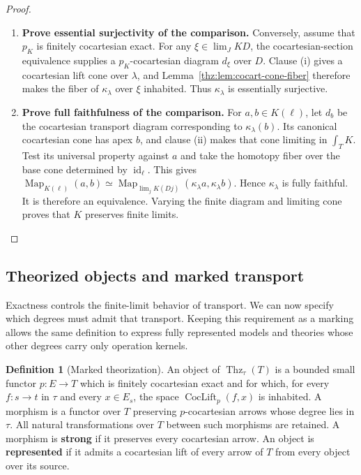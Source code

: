 \documentclass[oneside]{article}
\theoremstyle{plain}
\theoremstyle{definition}
\newtheorem{definition}[theorem]{Definition}
\theoremstyle{remark}
\newcommand{\Map}{\operatorname{Map}}
\newcommand{\Thz}{\operatorname{Thz}}
\newcommand{\id}{\operatorname{id}}
\begin{document}
\begin{proof}
\begin{enumerate}
\begin{samepage}
\end{samepage}
\item \textbf{Prove essential surjectivity of the comparison.} Conversely, assume that $p_K$ is finitely cocartesian exact.  For any
$\xi\in\lim_JKD$, the cocartesian-section equivalence supplies a
$p_K$-cocartesian diagram $d_\xi$ over $D$.  Clause (i) gives a
cocartesian lift cone over $\lambda$, and
Lemma~\ref{thz:lem:cocart-cone-fiber} therefore makes the fiber of
$\kappa_\lambda$ over $\xi$ inhabited.  Thus $\kappa_\lambda$ is
essentially surjective.
\item \textbf{Prove full faithfulness of the comparison.} For $a,b\in K(\ell)$, let $d_b$ be the cocartesian transport diagram
corresponding to $\kappa_\lambda(b)$.  Its canonical cocartesian cone has
apex $b$, and clause (ii) makes that cone limiting in $\int_TK$.  Test its
universal property against $a$ and take the homotopy fiber over the base cone
determined by $\id_\ell$.  This gives $\Map_{K(\ell)}(a,b)\simeq \Map_{\lim_jK(Dj)} (\kappa_\lambda a,\kappa_\lambda b).$ Hence $\kappa_\lambda$ is fully faithful.  It is therefore an equivalence.
Varying the finite diagram and limiting cone proves that $K$ preserves
finite limits.\qedhere
\end{enumerate}
\end{proof}

\subsection{Theorized objects and marked transport}

Exactness controls the finite-limit behavior of transport. We can now
specify which degrees must admit that transport. Keeping this requirement
as a marking allows the same definition to express fully represented
models and theories whose other degrees carry only operation kernels.

\begin{definition}[Marked theorization]\label{thz:def:thz}
An object of $\Thz_\tau(T)$ is a bounded small functor $p:E\to T$
which is finitely cocartesian exact and for which, for every
$f:s\to t$ in $\tau$ and every $x\in E_s$, the space
$\operatorname{CocLift}_p(f,x)$ is inhabited.  A morphism is a functor
over $T$ preserving $p$-cocartesian arrows whose degree lies in $\tau$.
All natural transformations over $T$ between such morphisms are retained.
A morphism is \textbf{strong} if it preserves every cocartesian arrow.  An
object is \textbf{represented} if it admits a cocartesian lift of every
arrow of $T$ from every object over its source.
\end{definition}
\end{document}
